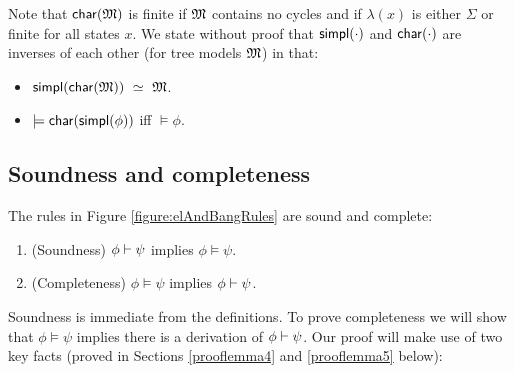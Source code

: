 \NI Note that $\mathsf{char}(\frak{M})$ is finite if $\frak{M}$ contains no cycles and
if $\lambda(x)$ is either $\Sigma$ or finite for all states $x$.  We
state without proof that $\mathsf{simpl}(\cdot)$ and $\mathsf{char}(\cdot)$ are
inverses of each other (for tree models $\frak{M}$) in that:

\begin{itemize}

\item $\mathsf{simpl}(\mathsf{char}(\frak{M})) \ \simeq \  \frak{M}$. 

\item $\models \mathsf{char}(\mathsf{simpl}(\phi))$ iff $\models\phi$.

\end{itemize}


\subsection{Soundness and completeness}

\begin{theorem}\label{theorem:elAndBang:soundComplete}
The rules in Figure \ref{figure:elAndBangRules} are sound and complete:
\begin{enumerate}

\item\label{theorem:elAndBang:sound} (Soundness) $\phi \vdash \psi$ implies $\phi \models \psi$.

\item\label{theorem:elAndBang:complete} (Completeness) $\phi \models \psi$ implies $\phi \vdash \psi$.

\end{enumerate}
\end{theorem}

\NI Soundness is immediate from the definitions. 
 To prove completeness  we will show that $\phi
\models \psi$ implies there is a derivation of $\phi \vdash \psi$.  Our proof
will make use of two key facts (proved in Sections \ref{prooflemma4} and \ref{prooflemma5} below):


